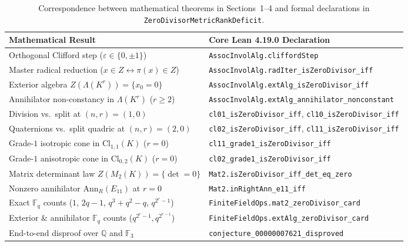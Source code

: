 \documentclass[11pt,a4paper]{article}
\theoremstyle{definition}
\theoremstyle{remark}
\newcommand{\Cl}{\mathrm{Cl}}
\newcommand{\Ann}{\mathrm{Ann}}
\begin{document}
\begin{table}[ht]
\centering
\footnotesize
\begin{tabular}{@{}ll@{}}
\toprule
Mathematical Result & Core Lean 4.19.0 Declaration \\
\midrule
Orthogonal Clifford step ($\varepsilon \in \{0, \pm 1\}$) & \texttt{AssocInvolAlg.cliffordStep} \\
Master radical reduction ($x \in Z \leftrightarrow \pi(x) \in Z$) & \texttt{AssocInvolAlg.radIter\_isZeroDivisor\_iff} \\
Exterior algebra $Z(\Lambda(K^r)) = \{x_0 = 0\}$ & \texttt{AssocInvolAlg.extAlg\_isZeroDivisor\_iff} \\
Annihilator non-constancy in $\Lambda(K^r)$ ($r \ge 2$) & \texttt{AssocInvolAlg.extAlg\_annihilator\_nonconstant} \\
Division vs.\ split at $(n, r) = (1, 0)$ & \texttt{cl01\_isZeroDivisor\_iff}, \texttt{cl10\_isZeroDivisor\_iff} \\
Quaternions vs.\ split quadric at $(n, r) = (2, 0)$ & \texttt{cl02\_isZeroDivisor\_iff}, \texttt{cl11\_isZeroDivisor\_iff} \\
Grade-$1$ isotropic cone in $\Cl_{1,1}(K)$ ($r = 0$) & \texttt{cl11\_grade1\_isZeroDivisor\_iff} \\
Grade-$1$ anisotropic cone in $\Cl_{0,2}(K)$ ($r = 0$) & \texttt{cl02\_grade1\_isZeroDivisor\_iff} \\
Matrix determinant law $Z(M_2(K)) = \{\det = 0\}$ & \texttt{Mat2.isZeroDivisor\_iff\_det\_eq\_zero} \\
Nonzero annihilator $\Ann_R(E_{11})$ at $r = 0$ & \texttt{Mat2.inRightAnn\_e11\_iff} \\
Exact $\mathbb{F}_q$ counts ($1$, $2q-1$, $q^3+q^2-q$, $q^{2^r-1}$) & \texttt{FiniteFieldOps.mat2\_zeroDivisor\_card} \\
Exterior \& annihilator $\mathbb{F}_q$ counts ($q^{2^r-1}, q^{2^{r-1}}$) & \texttt{FiniteFieldOps.extAlg\_zeroDivisor\_card} \\
End-to-end disproof over $\mathbb{Q}$ and $\mathbb{F}_3$ & \texttt{conjecture\_00000007621\_disproved} \\
\bottomrule
\end{tabular}
\caption{Correspondence between mathematical theorems in Sections~1--4 and formal declarations in \texttt{ZeroDivisorMetricRankDeficit}.}
\label{tab:lean-map}
\end{table}
\end{document}
